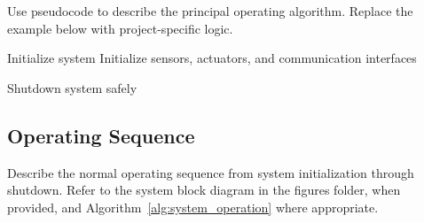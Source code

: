 Use pseudocode to describe the principal operating algorithm. Replace the
example below with project-specific logic.

\begin{algorithm}[H]
\caption{System Operating Algorithm}
\label{alg:system_operation}


Initialize system\;
Initialize sensors, actuators, and communication interfaces\;


Shutdown system safely\;

\end{algorithm}

\subsection{Operating Sequence}

Describe the normal operating sequence from system initialization through
shutdown. Refer to the system block diagram in the figures folder, when
provided, and Algorithm~\ref{alg:system_operation} where appropriate.

